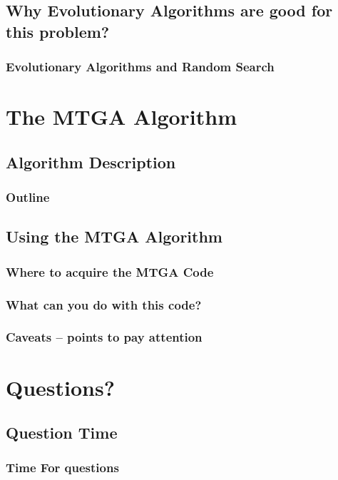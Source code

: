 \documentclass{beamer}[10pt]
\begin{document}
\subsection{Why Evolutionary Algorithms are good for this problem?}
\begin{frame}
  \frametitle{Evolutionary Algorithms and Random Search}
\end{frame}


\section{The MTGA Algorithm}
\subsection{Algorithm Description}
\begin{frame}
  \frametitle{Outline}
\end{frame}


\subsection{Using the MTGA Algorithm}
\begin{frame}
  \frametitle{Where to acquire the MTGA Code}
\end{frame}

\begin{frame}
  \frametitle{What can you do with this code?}
\end{frame}

\begin{frame}
  \frametitle{Caveats -- points to pay attention}
\end{frame}

\section{Questions?}
\subsection{Question Time}
\begin{frame}
  \frametitle{Time For questions}
\end{frame}
\end{document}

